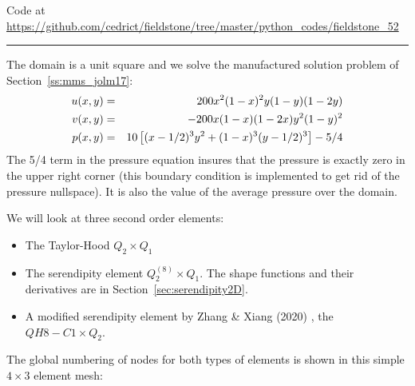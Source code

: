 

\begin{center}
Code at \url{https://github.com/cedrict/fieldstone/tree/master/python_codes/fieldstone_52}
\end{center}

\par\noindent\rule{\textwidth}{0.4pt}


The domain is a unit square and we solve the manufactured solution problem of Section~\ref{ss:mms_jolm17}:
\begin{eqnarray}
u(x,y) &=& 200x^2(1-x)^2y(1-y)(1-2y) \nonumber\\
v(x,y) &=& -200x(1-x)(1-2x)y^2(1-y)^2 \nonumber\\
p(x,y) &=& 10\left[(x-1/2)^3y^2+(1-x)^3(y-1/2)^3 \right] -5/4 \nonumber
\end{eqnarray}
The 5/4 term in the pressure equation insures that the pressure is exactly zero in the 
upper right corner (this boundary condition is implemented to get rid of 
the pressure nullspace). It is also the value of the average pressure over the domain.

We will look at three second order elements:
\begin{itemize}
\item The Taylor-Hood $Q_2\times Q_1$ 
\item The serendipity element $Q_2^{(8)}\times Q_1$. The shape functions 
and their derivatives are in Section~\ref{sec:serendipity2D}.
\item A modified serendipity element by 
Zhang \& Xiang (2020) \cite{zhxi20}, the $QH8-C1 \times Q_2$.
\end{itemize}

The global numbering of nodes for both types of elements is shown  
in this simple $4\times 3$ element mesh:

